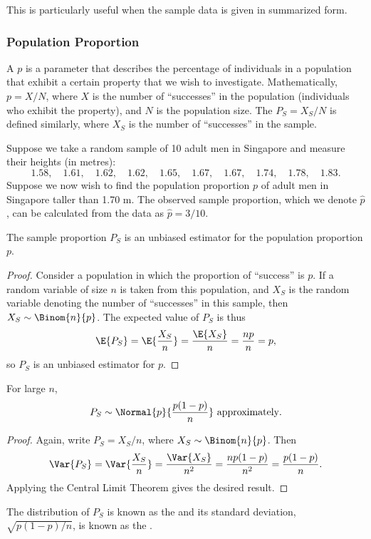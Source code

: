 This is particularly useful when the sample data is given in summarized form.

\subsubsection{Population Proportion}

\begin{definition}
    A  $p$ is a parameter that describes the percentage of individuals in a population that exhibit a certain property that we wish to investigate. Mathematically, $p = X/N$, where $X$ is the number of ``successes'' in the population (individuals who exhibit the property), and $N$ is the population size. The  $P_S = X_S/N$ is defined similarly, where $X_S$ is the number of ``successes'' in the sample.
\end{definition}

\begin{example}
    Suppose we take a random sample of 10 adult men in Singapore and measure their heights (in metres): \[1.58, \quad 1.61, \quad 1.62, \quad 1.62, \quad 1.65, \quad 1.67, \quad 1.67, \quad 1.74, \quad 1.78, \quad 1.83.\] Suppose we now wish to find the population proportion $p$ of adult men in Singapore taller than 1.70 m. The observed sample proportion, which we denote $\hat{p}$, can be calculated from the data as $\hat{p} = 3/10$.
\end{example}

\begin{proposition}
    The sample proportion $P_S$ is an unbiased estimator for the population proportion $p$.
\end{proposition}
\begin{proof}
    Consider a population in which the proportion of ``success'' is $p$. If a random variable of size $n$ is taken from this population, and $X_S$ is the random variable denoting the number of ``successes'' in this sample, then $X_S \sim \Binom{n}{p}$. The expected value of $P_S$ is thus \[\E{P_S} = \E{\frac{X_S}{n}} = \frac{\E{X_S}}{n} = \frac{np}{n} = p,\] so $P_S$ is an unbiased estimator for $p$.
\end{proof}

\begin{proposition}
    For large $n$, \[P_S \sim \Normal{p}{\frac{p(1-p)}{n}} \text{ approximately}.\]
\end{proposition}
\begin{proof}
    Again, write $P_S = X_S/n$, where $X_S \sim \Binom{n}{p}$. Then \[\Var{P_S} = \Var{\frac{X_S}{n}} = \frac{\Var{X_S}}{n^2} = \frac{np(1-p)}{n^2} = \frac{p(1-p)}{n}.\] Applying the Central Limit Theorem gives the desired result.
\end{proof}

\begin{definition}
    The distribution of $P_S$ is known as the  and its standard deviation, $\sqrt{p(1-p)/n}$, is known as the .
\end{definition}